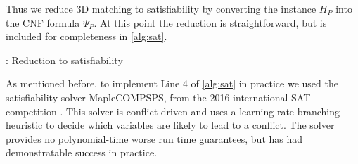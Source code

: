 \documentclass[11pt]{article}
\begin{document}
Thus we reduce 3D matching to satisfiability by converting the
instance $H_P$ into the CNF formula $\Psi_P$.  At this point the
reduction is straightforward, but is included for completeness in
\autoref{alg:sat}.

\begin{algorithm}
  \caption{: Reduction to satisfiability}
  \label{alg:sat}
\begin{algorithmic}[1]
  \Else
  \EndIf
  \EndFunction
\end{algorithmic}
\end{algorithm}

As mentioned before, to implement Line 4 of \autoref{alg:sat} in
practice we used the satisfiability solver MapleCOMPSPS, from the 2016
international SAT competition \cite{XXX - contest paper and contestant
  paper}.  This solver is conflict driven and uses a learning rate
branching heuristic to decide which variables are likely to lead to a
conflict.  The solver provides no polynomial-time worse run time
guarantees, but has had demonstratable success in practice.

  
  
\end{document}
